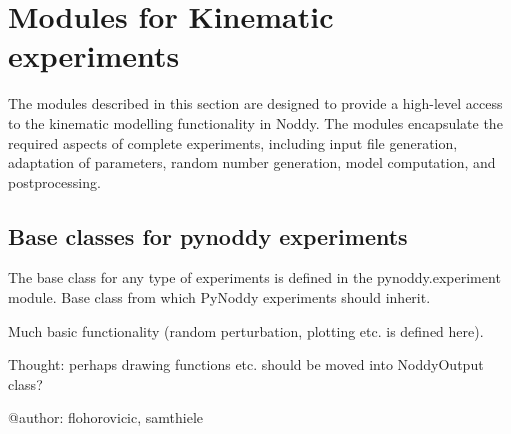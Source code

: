 \documentclass[a4paper,10pt,english]{sphinxmanual}
\begin{document}
\section{Modules for Kinematic experiments}
\label{pynoddy:modules-for-kinematic-experiments}
The modules described in this section are designed to provide a high-level
access to the kinematic modelling functionality in Noddy. The modules encapsulate
the required aspects of complete experiments, including input file generation,
adaptation of parameters, random number generation, model computation, and
postprocessing.


\subsection{Base classes for pynoddy experiments}
\label{pynoddy:base-classes-for-pynoddy-experiments}
The base class for any type of experiments is defined in the pynoddy.experiment module.
\label{pynoddy:module-pynoddy.experiment}
Base class from which PyNoddy experiments should inherit.

Much basic functionality (random perturbation, plotting etc. is defined here).

Thought: perhaps drawing functions etc. should be moved into NoddyOutput class?

@author: flohorovicic, samthiele
\end{document}
